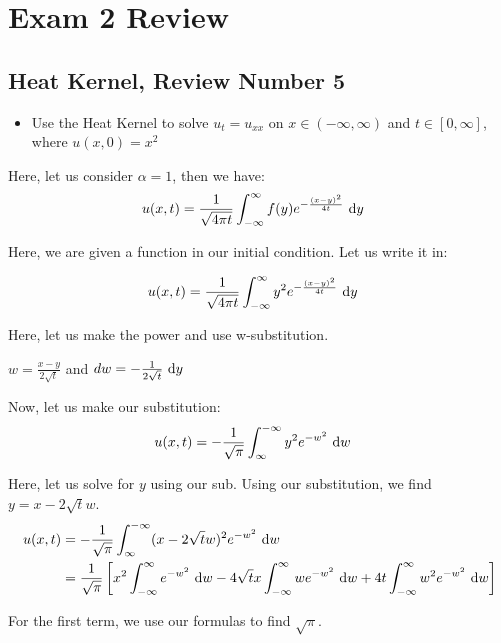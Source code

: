 \newpage
\section{Exam 2 Review}


\subsection*{Heat Kernel, Review Number 5}

\begin{itemize}
  \item Use the Heat Kernel to solve $u_t = u_{xx}$ on $x \in (-\infty, \infty)$ and $t \in [0, \infty]$, where $u(x, 0) = x^2$
\end{itemize}

Here, let us consider $\alpha = 1$, then we have:
%
\begin{align}
  u(x, t) & = \frac{1}{\sqrt{4 \pi t}} \int^\infty_{-\infty} f(y) e^{-\frac{(x - y)^2}{4t}}\ \text dy
\end{align}

Here, we are given a function in our initial condition. Let us write it in:

\begin{align}
  u(x, t) & = \frac{1}{\sqrt{4 \pi t}} \int^\infty_{-\infty} y^2 e^{-\frac{(x - y)^2}{4t}}\ \text dy
\end{align}

Here, let us make the power and use w-substitution.

$w = \frac{x - y}{2\sqrt t}$ and $dw = -\frac{1}{2 \sqrt t}\ \text dy$

Now, let us make our substitution:
%
\begin{align}
  u(x, t) & = - \frac{1}{\sqrt \pi} \int^{-\infty}_{\infty} y^2 e^{-w^2}\ \text dw
\end{align}

Here, let us solve for $y$ using our sub. Using our substitution, we find $y = x - 2 \sqrt t w$.
%
\begin{align}
  u(x, t) & = - \frac{1}{\sqrt \pi} \int^{-\infty}_{\infty} (x - 2 \sqrt t w)^2 e^{-w^2}\ \text dw\\
  & = \frac{1}{\sqrt \pi}
  \left[
  x^2 \int^\infty_{-\infty} e^{-w^2}\ \text dw
  - 4 \sqrt t x \int^\infty_{-\infty} w e^{-w^2}\ \text dw
  + 4t \int^\infty_{-\infty} w^2 e^{-w^2}\ \text dw
  \right]
\end{align}

For the first term, we use our formulas to find $\sqrt \pi$.

